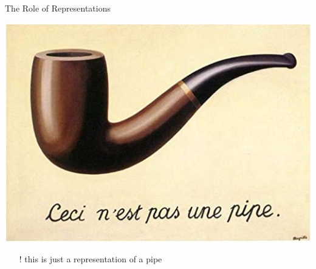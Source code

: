 \documentclass[presentation]{beamer}\mode<presentation>{\usetheme{AMSBolognaFC}}
\begin{document}
\begin{frame}{The Role of Representations}

    \begin{center}
        \includegraphics[width=.7\linewidth]{figures/pipe.jpg}
    \end{center}
    \begin{itemize}
        \item[!] this is just a \alert{representation} of a pipe
    \end{itemize}

\end{frame}
\end{document}

